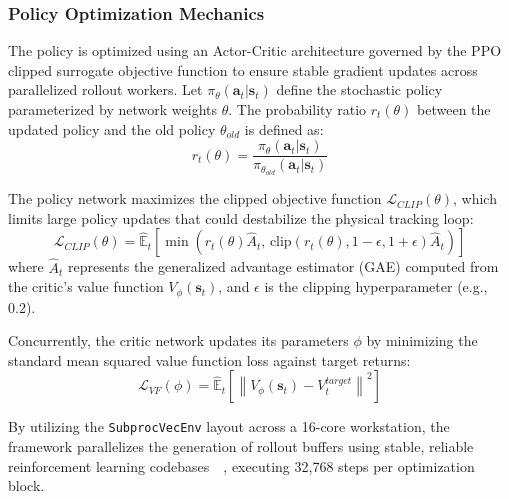 \documentclass[letterpaper, preprint, 11pt]{AAS}
\begin{document}
\subsubsection{Policy Optimization Mechanics}
The policy is optimized using an Actor-Critic architecture governed by the PPO clipped surrogate objective function to ensure stable gradient updates across parallelized rollout workers. Let $\pi_\theta(\mathbf{a}_t | \mathbf{s}_t)$ define the stochastic policy parameterized by network weights $\theta$. The probability ratio $r_t(\theta)$ between the updated policy and the old policy $\theta_{old}$ is defined as:
\begin{equation}
    r_t(\theta) = \frac{\pi_\theta(\mathbf{a}_t | \mathbf{s}_t)}{\pi_{\theta_{old}}(\mathbf{a}_t | \mathbf{s}_t)}
    \label{eq:probability_ratio}
\end{equation}

The policy network maximizes the clipped objective function $\mathcal{L}_{CLIP}(\theta)$, which limits large policy updates that could destabilize the physical tracking loop:
\begin{equation}
    \mathcal{L}_{CLIP}(\theta) = \hat{\mathbb{E}}_t \left[ \min\left( r_t(\theta)\hat{A}_t, \, \text{clip}\left(r_t(\theta), 1-\epsilon, 1+\epsilon\right)\hat{A}_t \right) \right]
    \label{eq:ppo_clip_objective}
\end{equation}
where $\hat{A}_t$ represents the generalized advantage estimator (GAE) computed from the critic's value function $V_\phi(\mathbf{s}_t)$, and $\epsilon$ is the clipping hyperparameter (e.g., 0.2). 

Concurrently, the critic network updates its parameters $\phi$ by minimizing the standard mean squared value function loss against target returns:
\begin{equation}
    \mathcal{L}_{VF}(\phi) = \hat{\mathbb{E}}_t \left[ \left\| V_\phi(\mathbf{s}_t) - V_t^{target} \right\|^2 \right]
    \label{eq:ppo_value_loss}
\end{equation}

By utilizing the \texttt{SubprocVecEnv} layout across a 16-core workstation, the framework parallelizes the generation of rollout buffers using stable, reliable reinforcement learning codebases~~\cite{hill_stable-baselines3_2021}, executing 32,768 steps per optimization block.

\end{document}
